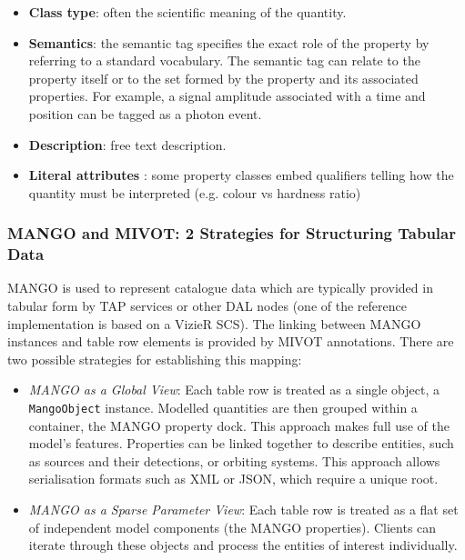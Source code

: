 \documentclass[11pt,a4paper]{ivoa}
\begin{document}
\begin{itemize}[noitemsep,topsep=0pt,parsep=0pt,partopsep=0pt]
    \item \textbf{Class type}: often the scientific meaning of the quantity.
    \item \textbf{Semantics}: the semantic tag specifies the exact role of the property by
          referring to a standard vocabulary. The semantic tag can relate to the property itself
          or to the set formed by the property and its associated properties.
          For example, a signal amplitude associated with a time and position can be tagged
          as a photon event.
    \item \textbf{Description}: free text description.
    \item \textbf{Literal attributes} : some property classes embed qualifiers telling 
          how the quantity must be interpreted (e.g. colour vs hardness ratio)
\end{itemize}


\subsubsection{MANGO and MIVOT: 2 Strategies for Structuring Tabular Data}

MANGO is used to represent catalogue data which are typically provided in tabular
form by TAP services \citep{2019ivoa.spec.0927D} 
or other DAL nodes (one of the reference implementation is based on a VizieR SCS).
The linking between MANGO instances and table row elements is provided by MIVOT annotations.
There are two possible strategies for establishing this mapping:

\begin{itemize}[noitemsep,topsep=0pt,parsep=0pt,partopsep=0pt]
    \item \textit{MANGO as a Global View}: Each table row is treated as a single object,
	      a \texttt{MangoObject} instance. 
		  Modelled quantities are then grouped within a container, the MANGO property dock. 
		  This approach makes full use of the model's features.
		  Properties can be linked together to describe entities, such as sources and their detections,
		  or orbiting systems.
		  This approach allows serialisation formats such as XML or JSON, which require a unique root.
    \item \textit{MANGO as a Sparse Parameter View}: Each table row is treated as a flat set of independent
	      model components (the MANGO properties).
          Clients can iterate through these objects and process
          the entities of interest individually.
\end{itemize}
\end{document}

